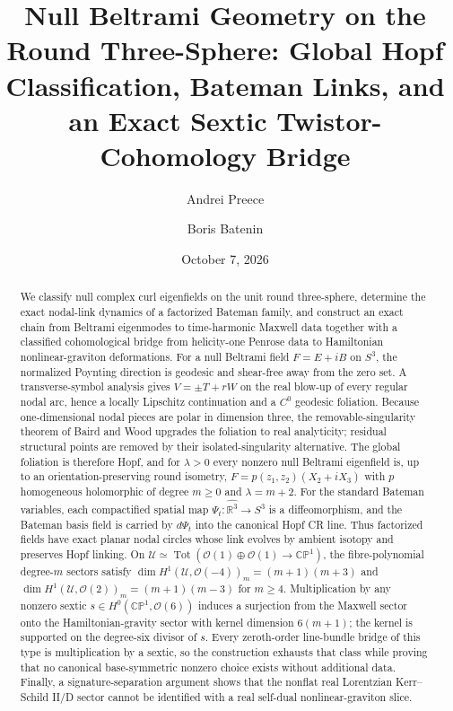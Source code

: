 \documentclass[aps,prd,reprint,nofootinbib,superscriptaddress]{revtex4-2}
\theoremstyle{definition}
\theoremstyle{remark}
\begin{document}
\title{Null Beltrami Geometry on the Round Three-Sphere: Global Hopf Classification, Bateman Links, and an Exact Sextic Twistor-Cohomology Bridge}

\author{Andrei Preece}

\author{Boris Batenin}

\date{October 7, 2026}

\begin{abstract}
We classify null complex curl eigenfields on the unit round three-sphere, determine the exact nodal-link dynamics of a factorized Bateman family, and construct an exact chain from Beltrami eigenmodes to time-harmonic Maxwell data together with a classified cohomological bridge from helicity-one Penrose data to Hamiltonian nonlinear-graviton deformations.  For a null Beltrami field $F=E+iB$ on $S^3$, the normalized Poynting direction is geodesic and shear-free away from the zero set.  A transverse-symbol analysis gives $V=\pm T+rW$ on the real blow-up of every regular nodal arc, hence a locally Lipschitz continuation and a $C^0$ geodesic foliation.  Because one-dimensional nodal pieces are polar in dimension three, the removable-singularity theorem of Baird and Wood upgrades the foliation to real analyticity; residual structural points are removed by their isolated-singularity alternative.  The global foliation is therefore Hopf, and for $\lambda>0$ every nonzero null Beltrami eigenfield is, up to an orientation-preserving round isometry, $F=p(z_1,z_2)(X_2+iX_3)$ with $p$ homogeneous holomorphic of degree $m\ge0$ and $\lambda=m+2$.  For the standard Bateman variables, each compactified spatial map $\Psi_t:\widehat{\mathbb R^3}\to S^3$ is a diffeomorphism, and the Bateman basis field is carried by $d\Psi_t$ into the canonical Hopf CR line.  Thus factorized fields have exact planar nodal circles whose link evolves by ambient isotopy and preserves Hopf linking.  On $\mathcal U\simeq\operatorname{Tot}(\mathcal O(1)\oplus\mathcal O(1)\to\mathbb{CP}^1)$, the fibre-polynomial degree-$m$ sectors satisfy $\dim H^1(\mathcal U,\mathcal O(-4))_m=(m+1)(m+3)$ and $\dim H^1(\mathcal U,\mathcal O(2))_m=(m+1)(m-3)$ for $m\ge4$.  Multiplication by any nonzero sextic $s\in H^0(\mathbb{CP}^1,\mathcal O(6))$ induces a surjection from the Maxwell sector onto the Hamiltonian-gravity sector with kernel dimension $6(m+1)$; the kernel is supported on the degree-six divisor of $s$.  Every zeroth-order line-bundle bridge of this type is multiplication by a sextic, so the construction exhausts that class while proving that no canonical base-symmetric nonzero choice exists without additional data.  Finally, a signature-separation argument shows that the nonflat real Lorentzian Kerr--Schild II/D sector cannot be identified with a real self-dual nonlinear-graviton slice.
\end{abstract}
\end{document}

